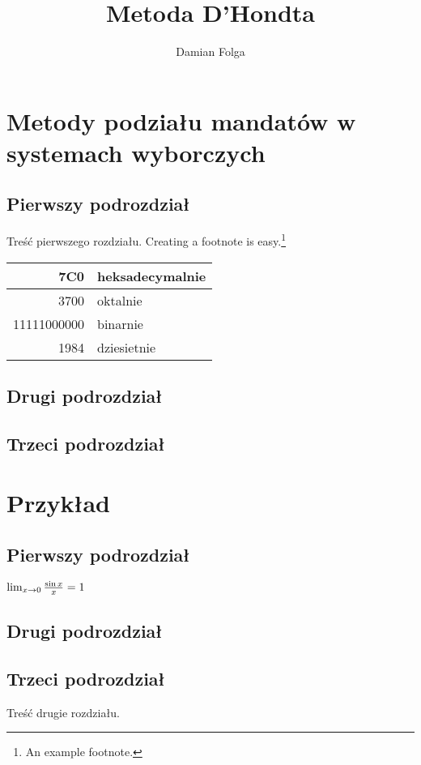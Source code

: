 \documentclass[12pt,a4paper,titlepage]{report}
\author{Damian Folga}
\title{Metoda D'Hondta}
\begin{document}
\maketitle
\tableofcontents
\newpage
\chapter{Metody podziału mandatów w systemach wyborczych}
\section{Pierwszy podrozdział}
Treść pierwszego rozdziału.
Creating a footnote is easy.\footnote{An example footnote.}

\begin{tabular}{|r|l|} \hline
7C0 & heksadecymalnie \\
\hline \hline
3700 & oktalnie \\
\hline \hline
11111000000 & binarnie \\
\hline \hline
1984 & dziesietnie \\ \hline

\end{tabular}

\section{Drugi podrozdział}
\section{Trzeci podrozdział}
\newpage
\chapter{Przykład}
\section{Pierwszy podrozdział}
\begin{math}
 $$
\lim_{x \rightarrow 0} \frac{\sin x}{x}=1
$$
\end{math}

\section{Drugi podrozdział}
\section{Trzeci podrozdział}
\cite{pa}Treść drugie rozdziału.
\end{document}
